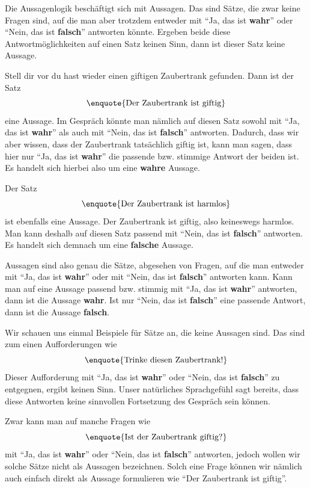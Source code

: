 \documentclass[../../main.tex]{subfiles}
\begin{document}
    Die Aussagenlogik beschäftigt sich mit Aussagen. Das sind Sätze, die zwar keine Fragen sind, auf die man aber trotzdem entweder mit \enquote{Ja, das ist \textbf{wahr}} oder \enquote{Nein, das ist \textbf{falsch}} antworten könnte. Ergeben beide diese Antwortmöglichkeiten auf einen Satz keinen Sinn, dann ist dieser Satz keine Aussage.
    \begin{example}{}
        Stell dir vor du hast wieder einen giftigen Zaubertrank gefunden. Dann ist der Satz
        \[\textrm{\enquote{Der Zaubertrank ist giftig}}\]
        eine Aussage.
        Im Gespräch könnte man nämlich auf diesen Satz sowohl mit \enquote{Ja, das ist \textbf{wahr}} als auch mit \enquote{Nein, das ist \textbf{falsch}} antworten. 
        Dadurch, dass wir aber wissen, dass der Zaubertrank tatsächlich giftig ist, kann man sagen, dass hier nur \enquote{Ja, das ist \textbf{wahr}} die passende bzw. stimmige Antwort der beiden ist. Es handelt sich hierbei also um eine \textbf{wahre} Aussage.
        
        Der Satz
        \[\textrm{\enquote{Der Zaubertrank ist harmlos}}\]
        ist ebenfalls eine Aussage. Der Zaubertrank ist giftig, also keineswegs harmlos. Man kann deshalb auf diesen Satz passend mit \enquote{Nein, das ist \textbf{falsch}} antworten. Es handelt sich demnach um eine \textbf{falsche} Aussage.
    \end{example}
    
    Aussagen sind also genau die Sätze, abgesehen von Fragen, auf die man entweder mit \enquote{Ja, das ist \textbf{wahr}} oder mit \enquote{Nein, das ist \textbf{falsch}} antworten kann. Kann man auf eine Aussage passend bzw. stimmig mit \enquote{Ja, das ist \textbf{wahr}} antworten, dann ist die Aussage \textbf{wahr}. Ist nur \enquote{Nein, das ist \textbf{falsch}} eine passende Antwort, dann ist die Aussage \textbf{falsch}.

    \begin{example}{}
        Wir schauen uns einmal Beispiele für Sätze an, die keine Aussagen sind. Das sind zum einen Aufforderungen wie
        \[\textrm{\enquote{Trinke diesen Zaubertrank!}}\]
        Dieser Aufforderung mit \enquote{Ja, das ist \textbf{wahr}} oder \enquote{Nein, das ist \textbf{falsch}} zu entgegnen, ergibt keinen Sinn. Unser natürliches Sprachgefühl sagt bereits, dass diese Antworten keine sinnvollen Fortsetzung des Gespräch sein können.
        
        Zwar kann man auf manche Fragen wie
         \[\textrm{\enquote{Ist der Zaubertrank giftig?}}\]
        mit \enquote{Ja, das ist \textbf{wahr}} oder \enquote{Nein, das ist \textbf{falsch}} antworten, jedoch wollen wir solche Sätze nicht als Aussagen bezeichnen. Solch eine Frage können wir nämlich auch einfach direkt als Aussage formulieren wie
        \enquote{Der Zaubertrank ist giftig}.
    \end{example}
\end{document}
